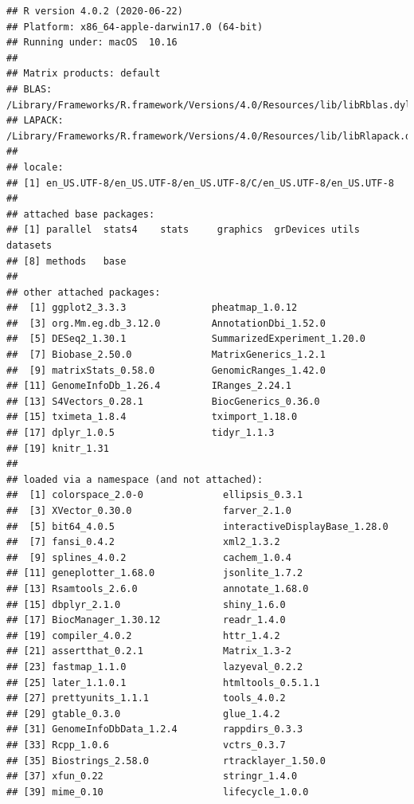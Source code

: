 \documentclass[]{article}
\begin{document}
\begin{verbatim}
## R version 4.0.2 (2020-06-22)
## Platform: x86_64-apple-darwin17.0 (64-bit)
## Running under: macOS  10.16
## 
## Matrix products: default
## BLAS:   /Library/Frameworks/R.framework/Versions/4.0/Resources/lib/libRblas.dylib
## LAPACK: /Library/Frameworks/R.framework/Versions/4.0/Resources/lib/libRlapack.dylib
## 
## locale:
## [1] en_US.UTF-8/en_US.UTF-8/en_US.UTF-8/C/en_US.UTF-8/en_US.UTF-8
## 
## attached base packages:
## [1] parallel  stats4    stats     graphics  grDevices utils     datasets 
## [8] methods   base     
## 
## other attached packages:
##  [1] ggplot2_3.3.3               pheatmap_1.0.12            
##  [3] org.Mm.eg.db_3.12.0         AnnotationDbi_1.52.0       
##  [5] DESeq2_1.30.1               SummarizedExperiment_1.20.0
##  [7] Biobase_2.50.0              MatrixGenerics_1.2.1       
##  [9] matrixStats_0.58.0          GenomicRanges_1.42.0       
## [11] GenomeInfoDb_1.26.4         IRanges_2.24.1             
## [13] S4Vectors_0.28.1            BiocGenerics_0.36.0        
## [15] tximeta_1.8.4               tximport_1.18.0            
## [17] dplyr_1.0.5                 tidyr_1.1.3                
## [19] knitr_1.31                 
## 
## loaded via a namespace (and not attached):
##  [1] colorspace_2.0-0              ellipsis_0.3.1               
##  [3] XVector_0.30.0                farver_2.1.0                 
##  [5] bit64_4.0.5                   interactiveDisplayBase_1.28.0
##  [7] fansi_0.4.2                   xml2_1.3.2                   
##  [9] splines_4.0.2                 cachem_1.0.4                 
## [11] geneplotter_1.68.0            jsonlite_1.7.2               
## [13] Rsamtools_2.6.0               annotate_1.68.0              
## [15] dbplyr_2.1.0                  shiny_1.6.0                  
## [17] BiocManager_1.30.12           readr_1.4.0                  
## [19] compiler_4.0.2                httr_1.4.2                   
## [21] assertthat_0.2.1              Matrix_1.3-2                 
## [23] fastmap_1.1.0                 lazyeval_0.2.2               
## [25] later_1.1.0.1                 htmltools_0.5.1.1            
## [27] prettyunits_1.1.1             tools_4.0.2                  
## [29] gtable_0.3.0                  glue_1.4.2                   
## [31] GenomeInfoDbData_1.2.4        rappdirs_0.3.3               
## [33] Rcpp_1.0.6                    vctrs_0.3.7                  
## [35] Biostrings_2.58.0             rtracklayer_1.50.0           
## [37] xfun_0.22                     stringr_1.4.0                
## [39] mime_0.10                     lifecycle_1.0.0              

\end{verbatim}
\end{document}
